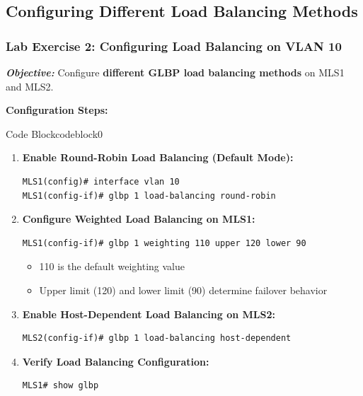 \documentclass[a4paper]{book}
\begin{document}
\subsection{Configuring Different Load Balancing Methods}
\subsubsection{Lab Exercise 2: Configuring Load Balancing on VLAN 10}
\textbf{\textit{Objective:}} Configure \textbf{different GLBP load balancing methods} on MLS1 and MLS2.
\vspace{1em}

\textbf{Configuration Steps:}


\vspace{1.5em}


\begin{ocg}{Code Block}{codeblock}{0}

\vspace{0.5cm}

\begin{enumerate}
\item \textbf{Enable Round-Robin Load Balancing (Default Mode):}
\begin{lstlisting}
MLS1(config)# interface vlan 10
MLS1(config-if)# glbp 1 load-balancing round-robin
\end{lstlisting}

\item \textbf{Configure Weighted Load Balancing on MLS1:}
\begin{lstlisting}
MLS1(config-if)# glbp 1 weighting 110 upper 120 lower 90
\end{lstlisting}
\begin{itemize}
\item 110 is the default weighting value
\item Upper limit (120) and lower limit (90) determine failover behavior
\end{itemize}

\item \textbf{Enable Host-Dependent Load Balancing on MLS2:}
\begin{lstlisting}
MLS2(config-if)# glbp 1 load-balancing host-dependent
\end{lstlisting}

\item \textbf{Verify Load Balancing Configuration:}
\begin{lstlisting}
MLS1# show glbp
\end{lstlisting}
\end{enumerate}
\end{ocg}
\end{document}
